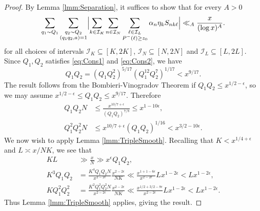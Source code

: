 \documentclass[10pt]{amsart}
\theoremstyle{plain}
\numberwithin{equation}{section}
\begin{document}
%
%
%
%
\begin{proof}
By Lemma \ref{lmm:Separation}, it suffices to show that for every $A>0$
\[
\sum_{q_1\sim Q_1}\sum_{\substack{q_2\sim Q_2\\ (q_1q_2,a)=1}}\Bigl|\sum_{k\in\mathcal{I}_K}\sum_{n\in\mathcal{I}_N}\sum_{\substack{\ell\in\mathcal{I}_L\\ P^-(\ell)\ge z_0}} \alpha_n \eta_k S_{n k \ell}\Bigr|\ll_A \frac{x}{(\log{x})^A}.
\]
for all choices of intervals $\mathcal{I}_K\subseteq[K,2K]$, $\mathcal{I}_N\subseteq[N,2N]$ and $\mathcal{I}_L\subseteq[L,2L]$. Since $Q_1,Q_2$ satisfies \eqref{eq:Cons1} and \eqref{eq:Cons2}, we have 
\[
Q_1Q_2=(Q_1Q_2^2)^{5/17}(Q_1^{12}Q_2^7)^{1/17}<x^{9/17}.
\]
The result follows from the Bombieri-Vinogradov Theorem if $Q_1Q_2\le x^{1/2-\epsilon}$, so we may assume $x^{1/2-\epsilon}\le Q_1Q_2\le x^{9/17}$. Therefore 
\begin{align*}
Q_1 Q_2 N&\le  \frac{x^{10/7+\epsilon}}{(Q_1Q_2)^{7/8}}\le x^{1-10\epsilon},\\
Q_1^2Q_2^2 N&\le x^{10/7+\epsilon}(Q_1Q_2)^{1/16}<x^{3/2-10\epsilon}.
\end{align*}
 We now wish to apply Lemma \ref{lmm:TripleSmooth}. Recalling that $K<x^{1/4+\epsilon}$ and $L\asymp x/N K$, we see that
\begin{align*}
KL&\gg \frac{x}{N}\gg  x^\epsilon Q_1Q_2,\\
K^3Q_1Q_2&=\frac{K^4 Q_1 Q_2 N}{x^{2-2\epsilon}}\frac{x^{2-2\epsilon}}{N K}\ll\frac{x^{1+1-6\epsilon}}{x^{2-2\epsilon}} L x^{1-2\epsilon}< L x^{1-2\epsilon},\\
K Q_1^2Q_2^2&=\frac{K^2Q_1^2 Q_2^2 N}{x^{2-2\epsilon}}\frac{x^{2-2\epsilon}}{N K}\ll \frac{x^{1/2+3/2-8\epsilon}}{x^{2-2\epsilon}}L x^{1-2\epsilon}<L x^{1-2\epsilon}.
\end{align*}
Thus Lemma \ref{lmm:TripleSmooth} applies, giving the result.
\end{proof}
%
%
%
%
%
%
%
%
\end{document}
